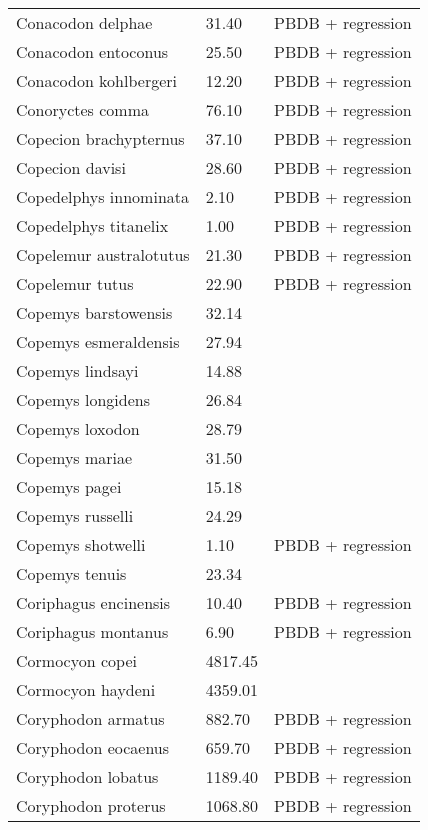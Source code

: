 \documentclass{article}
\begin{document}
\begin{center}
\begin{longtable}{p{} p{} p{}}
    Conacodon delphae & 31.40 & PBDB + regression \\ 
    Conacodon entoconus & 25.50 & PBDB + regression \\ 
    Conacodon kohlbergeri & 12.20 & PBDB + regression \\ 
    Conoryctes comma & 76.10 & PBDB + regression \\ 
    Copecion brachypternus & 37.10 & PBDB + regression \\ 
    Copecion davisi & 28.60 & PBDB + regression \\ 
    Copedelphys innominata & 2.10 & PBDB + regression \\ 
    Copedelphys titanelix & 1.00 & PBDB + regression \\ 
    Copelemur australotutus & 21.30 & PBDB + regression \\ 
    Copelemur tutus & 22.90 & PBDB + regression \\ 
    Copemys barstowensis & 32.14 & \cite{Tomiya2013} \\ 
    Copemys esmeraldensis & 27.94 & \cite{Tomiya2013} \\ 
    Copemys lindsayi & 14.88 & \cite{Tomiya2013} \\ 
    Copemys longidens & 26.84 & \cite{Tomiya2013} \\ 
    Copemys loxodon & 28.79 & \cite{Tomiya2013} \\ 
    Copemys mariae & 31.50 & \cite{Tomiya2013} \\ 
    Copemys pagei & 15.18 & \cite{Tomiya2013} \\ 
    Copemys russelli & 24.29 & \cite{Tomiya2013} \\ 
    Copemys shotwelli & 1.10 & PBDB + regression \\ 
    Copemys tenuis & 23.34 & \cite{Tomiya2013} \\ 
    Coriphagus encinensis & 10.40 & PBDB + regression \\ 
    Coriphagus montanus & 6.90 & PBDB + regression \\ 
    Cormocyon copei & 4817.45 & \cite{Tomiya2013} \\ 
    Cormocyon haydeni & 4359.01 & \cite{Tomiya2013} \\ 
    Coryphodon armatus & 882.70 & PBDB + regression \\ 
    Coryphodon eocaenus & 659.70 & PBDB + regression \\ 
    Coryphodon lobatus & 1189.40 & PBDB + regression \\ 
    Coryphodon proterus & 1068.80 & PBDB + regression \\ 

\end{longtable}
\end{center}
\end{document}
